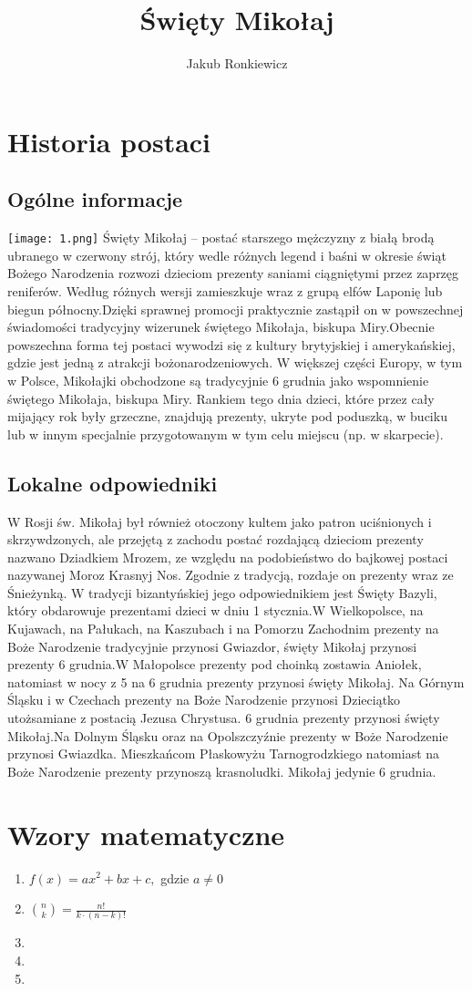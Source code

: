 \documentclass{report}
\title{Święty Mikołaj}
\author{Jakub Ronkiewicz}
\begin{document}
\maketitle

\chapter{Historia postaci}
\section{Ogólne informacje}
\texttt{[image: 1.png]}\newline
Święty Mikołaj – postać starszego mężczyzny z białą brodą ubranego w czerwony strój, który wedle różnych legend i baśni w okresie świąt Bożego Narodzenia rozwozi dzieciom prezenty saniami ciągniętymi przez zaprzęg reniferów. Według różnych wersji zamieszkuje wraz z grupą elfów Laponię lub biegun północny.Dzięki sprawnej promocji praktycznie zastąpił on w powszechnej świadomości tradycyjny wizerunek świętego Mikołaja, biskupa Miry.Obecnie powszechna forma tej postaci wywodzi się z kultury brytyjskiej i amerykańskiej, gdzie jest jedną z atrakcji bożonarodzeniowych. W większej części Europy, w tym w Polsce, Mikołajki obchodzone są tradycyjnie 6 grudnia jako wspomnienie świętego Mikołaja, biskupa Miry. Rankiem tego dnia dzieci, które przez cały mijający rok były grzeczne, znajdują prezenty, ukryte pod poduszką, w buciku lub w innym specjalnie przygotowanym w tym celu miejscu (np. w skarpecie).\newpage
\section{Lokalne odpowiedniki}
W Rosji św. Mikołaj był również otoczony kultem jako patron uciśnionych i skrzywdzonych, ale przejętą z zachodu postać rozdającą dzieciom prezenty nazwano Dziadkiem Mrozem, ze względu na podobieństwo do bajkowej postaci nazywanej Moroz Krasnyj Nos. Zgodnie z tradycją, rozdaje on prezenty wraz ze Śnieżynką. W tradycji bizantyńskiej jego odpowiednikiem jest Święty Bazyli, który obdarowuje prezentami dzieci w dniu 1 stycznia.W Wielkopolsce, na Kujawach, na Pałukach, na Kaszubach i na Pomorzu Zachodnim prezenty na Boże Narodzenie tradycyjnie przynosi Gwiazdor, święty Mikołaj przynosi prezenty 6 grudnia.W Małopolsce prezenty pod choinką zostawia Aniołek, natomiast w nocy z 5 na 6 grudnia prezenty przynosi święty Mikołaj. Na Górnym Śląsku i w Czechach prezenty na Boże Narodzenie przynosi Dzieciątko utożsamiane z postacią Jezusa Chrystusa. 6 grudnia prezenty przynosi święty Mikołaj.Na Dolnym Śląsku oraz na Opolszczyźnie prezenty w Boże Narodzenie przynosi Gwiazdka. Mieszkańcom Płaskowyżu Tarnogrodzkiego natomiast na Boże Narodzenie prezenty przynoszą krasnoludki. Mikołaj jedynie 6 grudnia.
\chapter{Wzory matematyczne}
\begin{enumerate}
\item $f(x)=ax^2+bx+c,$ gdzie $a \ne 0$
\item $\binom{n}{k}=\frac{n!}{k\cdot(n-k)!}$
\item
\item
\item
\end{enumerate}
\end{document}
